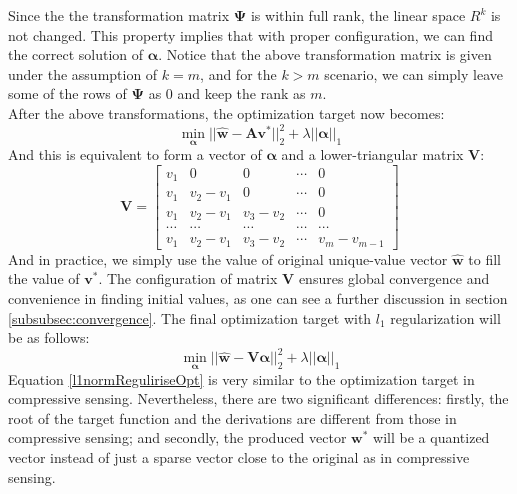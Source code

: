 \documentclass[preprint,10pt]{elsarticle}
\begin{document}
Since the the transformation matrix $\boldsymbol{\Psi}$ is within full rank, the linear space $R^{k}$ is not changed. This property implies that with proper configuration, we can find the correct solution of $\boldsymbol{\alpha}$. Notice that the above transformation matrix is given under the assumption of $k=m$, and for the $k>m$ scenario, we can simply leave some of the rows of $\boldsymbol{\Psi}$ as $0$ and keep the rank as $m$.\\
After the above transformations, the optimization target now becomes:\\
\begin{equation}
\min_{\boldsymbol{\alpha}} ||\boldsymbol{\hat{w}}-\boldsymbol{A}\boldsymbol{v}^{*}||_{2}^{2} + \lambda ||\boldsymbol{\alpha}||_{1}
\end{equation}
And this is equivalent to form a vector of $\boldsymbol{\alpha}$ and a lower-triangular matrix $\boldsymbol{V}$:\\
$$
\boldsymbol{V} = 
\begin{bmatrix}
v_{1} & 0 & 0 & \cdots & 0\\
v_{1} & v_{2}-v_{1} & 0 & \cdots & 0 \\
v_{1} & v_{2}-v_{1} & v_{3}-v_{2} & \cdots & 0\\
\cdots & \cdots & \cdots & \cdots & \cdots \\
v_{1} & v_{2}-v_{1} & v_{3}-v_{2} & \cdots & v_{m}-v_{m-1}
\end{bmatrix}
$$
And in practice, we simply use the value of original unique-value vector $\boldsymbol{\hat{w}}$ to fill the value of $\boldsymbol{v}^{*}$. The configuration of matrix $\boldsymbol{V}$ ensures global convergence and convenience in finding initial values, as one can see a further discussion in section \ref{subsubsec:convergence}. The final optimization target with $l_1$ regularization will be as follows:\\
\begin{equation}\label{l1normReguliriseOpt}
\min_{\boldsymbol{\alpha}} ||\boldsymbol{\hat{w}} -\boldsymbol{V}\boldsymbol{\alpha}||_{2}^{2} + \lambda ||\boldsymbol{\alpha}||_{1}
\end{equation}
Equation \ref{l1normReguliriseOpt} is very similar to the optimization target in compressive sensing. Nevertheless, there are two significant differences: firstly, the root of the target function and the derivations are different from those in compressive sensing; and secondly, the produced vector $\boldsymbol{w}^{*}$ will be a quantized vector instead of just a sparse vector close to the original as in compressive sensing. \par
\end{document}
